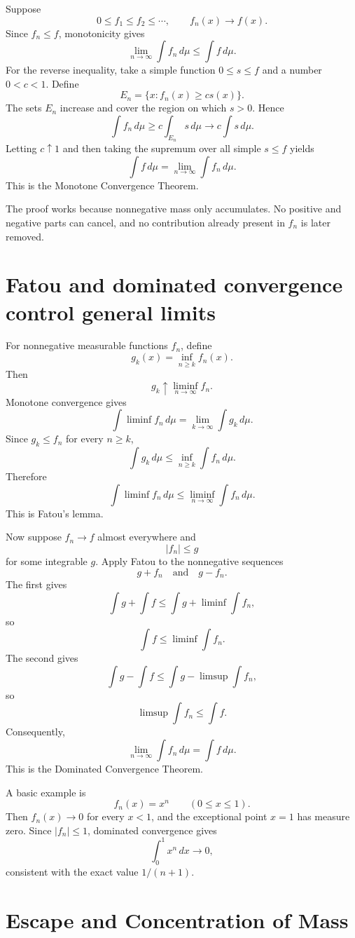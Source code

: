 Suppose
\[
  0\le f_1\le f_2\le\cdots,
  \qquad
  f_n(x)\to f(x).
\]
Since \(f_n\le f\), monotonicity gives
\[
  \lim_{n\to\infty}\int f_n\,d\mu
  \le\int f\,d\mu.
\]
For the reverse inequality, take a simple function \(0\le s\le f\) and a number \(0<c<1\).  Define
\[
  E_n=\{x:f_n(x)\ge c s(x)\}.
\]
The sets \(E_n\) increase and cover the region on which \(s>0\).  Hence
\[
  \int f_n\,d\mu
  \ge c\int_{E_n}s\,d\mu
  \longrightarrow c\int s\,d\mu.
\]
Letting \(c\uparrow1\) and then taking the supremum over all simple \(s\le f\) yields
\[
  \boxed{
  \int f\,d\mu
  =\lim_{n\to\infty}\int f_n\,d\mu.}
\]
This is the Monotone Convergence Theorem.

The proof works because nonnegative mass only accumulates.  No positive and negative parts can cancel, and no contribution already present in \(f_n\) is later removed.

\section{Fatou and dominated convergence control general limits}

For nonnegative measurable functions \(f_n\), define
\[
  g_k(x)=\inf_{n\ge k}f_n(x).
\]
Then
\[
  g_k\uparrow\liminf_{n\to\infty}f_n.
\]
Monotone convergence gives
\[
  \int\liminf f_n\,d\mu
  =\lim_{k\to\infty}\int g_k\,d\mu.
\]
Since \(g_k\le f_n\) for every \(n\ge k\),
\[
  \int g_k\,d\mu
  \le\inf_{n\ge k}\int f_n\,d\mu.
\]
Therefore
\[
  \boxed{
  \int\liminf f_n\,d\mu
  \le\liminf_{n\to\infty}\int f_n\,d\mu.}
\]
This is Fatou's lemma.

Now suppose \(f_n\to f\) almost everywhere and
\[
  |f_n|\le g
\]
for some integrable \(g\).  Apply Fatou to the nonnegative sequences
\[
  g+f_n
  \quad\text{and}\quad
  g-f_n.
\]
The first gives
\[
  \int g+\int f
  \le\int g+\liminf\int f_n,
\]
so
\[
  \int f\le\liminf\int f_n.
\]
The second gives
\[
  \int g-\int f
  \le\int g-\limsup\int f_n,
\]
so
\[
  \limsup\int f_n\le\int f.
\]
Consequently,
\[
  \boxed{
  \lim_{n\to\infty}\int f_n\,d\mu
  =\int f\,d\mu.}
\]
This is the Dominated Convergence Theorem.

A basic example is
\[
  f_n(x)=x^n
  \qquad(0\le x\le1).
\]
Then \(f_n(x)\to0\) for every \(x<1\), and the exceptional point \(x=1\) has measure zero.  Since \(|f_n|\le1\), dominated convergence gives
\[
  \int_0^1x^n\,dx\longrightarrow0,
\]
consistent with the exact value \(1/(n+1)\).

\section{Escape and Concentration of Mass}

